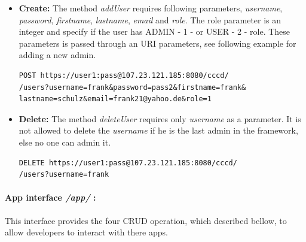 \begin{itemize}
\item \textbf{Create:} The method \textit{addUser} requires following parameters, \textit{username}, \textit{password}, \textit{firstname}, \textit{lastname}, \textit{email} and \textit{role}.  The role parameter is an integer and specify if the user has ADMIN - 1 - or USER - 2 - role. These parameters is passed through an \ac{URI} parameters, see following example for adding a new admin.

\begin{code}
\begin{verbatim}
POST https://user1:pass@107.23.121.185:8080/cccd/
/users?username=frank&password=pass2&firstname=frank&
lastname=schulz&email=frank21@yahoo.de&role=1
\end{verbatim}
\end{code}

\item \textbf{Delete:} The method \textit{deleteUser} requires only \textit{username} as a parameter. It is not allowed to delete the \textit{username} if he is the last admin in the framework, else no one can admin it.

\begin{code}
\begin{verbatim}
DELETE https://user1:pass@107.23.121.185:8080/cccd/
/users?username=frank
\end{verbatim}
\end{code}

\end{itemize}


\paragraph{App interface \textit{/app/} :} This interface provides the four \ac{CRUD} operation, which described bellow, to allow developers to interact with there apps.

